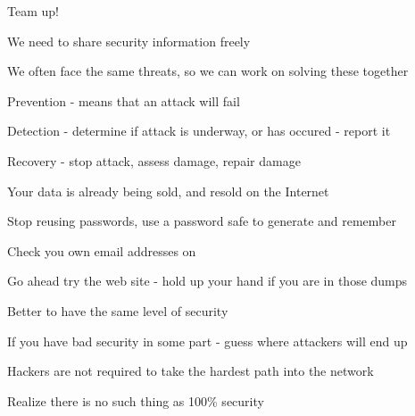 \documentclass[Screen16to9,17pt]{foils}
\begin{document}


\begin{list1}
\item Team up!
\item We need to share security information freely
\item We often face the same threats, so we can work on solving these together
\end{list1}


\begin{list1}
\item Prevention - means that an attack will fail
\item Detection - determine if attack is underway, or has occured - report it
\item Recovery - stop attack, assess damage, repair damage
\end{list1}




\begin{list1}
\item Your data is already being sold, and resold on the Internet
\item Stop reusing passwords, use a password safe to generate and remember
\item Check you own email addresses on 
\end{list1}

\centerline{Go ahead try the web site - hold up your hand if you are in those dumps}





\begin{list1}
\item Better to have the same level of security
\item If you have bad security in some part - guess where attackers will end up
\item Hackers are not required to take the hardest path into the network
\item Realize there is no such thing as 100\% security
\end{list1}
\end{document}
